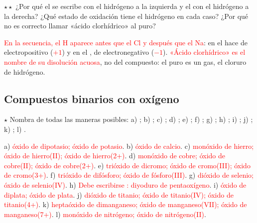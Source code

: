 \begin{exercise}
    \(\star\star\) ¿Por qué el  se escribe con el hidrógeno a la izquierda y el  con el hidrógeno a la derecha?
    ¿Qué estado de oxidación tiene el hidrógeno en cada caso? ¿Por qué no es correcto llamar «ácido clorhídrico» al  puro?
    \begin{solu}
        \textcolor{red}{En la secuencia, el H aparece antes que el Cl y después que el Na}: en el  hace de electropositivo
        (\textcolor{red}{\(+1\)}) y en el , de electronegativo (\textcolor{red}{\(-1\)}). \textcolor{red}{«Ácido
        clorhídrico» es el nombre de su disolución acuosa}, no del compuesto: el  puro es un gas, el cloruro de hidrógeno.
    \end{solu}
\end{exercise}

\subsection{Compuestos binarios con oxígeno}

\begin{exercise}
    \(\star\) Nombra de todas las maneras posibles: a) ; b) ; c) ; d) ; e) ; f)
    ; g) ; h) ; i) ; j) ; k) ; l) .
    \begin{solu}
        a) \textcolor{red}{óxido de dipotasio; óxido de potasio}. b) \textcolor{red}{óxido de calcio}. c) \textcolor{red}{monóxido
        de hierro; óxido de hierro(II); óxido de hierro(2+)}. d) \textcolor{red}{monóxido de cobre; óxido de cobre(II); óxido de
        cobre(2+)}. e) \textcolor{red}{trióxido de dicromo; óxido de cromo(III); óxido de cromo(3+)}. f) \textcolor{red}{trióxido de
        difósforo; óxido de fósforo(III)}. g) \textcolor{red}{dióxido de selenio; óxido de selenio(IV)}. h) \textcolor{red}{Debe
        escribirse : diyoduro de pentaoxígeno}. i) \textcolor{red}{óxido de diplata; óxido de plata}. j)
        \textcolor{red}{dióxido de titanio; óxido de titanio(IV); óxido de titanio(4+)}. k) \textcolor{red}{heptaóxido de
        dimanganeso; óxido de manganeso(VII); óxido de manganeso(7+)}. l) \textcolor{red}{monóxido de nitrógeno; óxido de
        nitrógeno(II)}.
    \end{solu}
\end{exercise}

